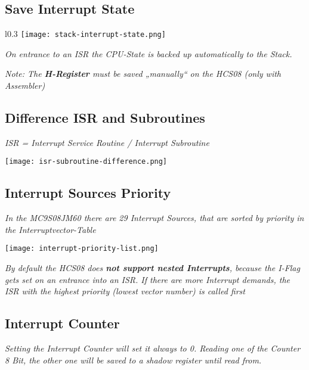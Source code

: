 \subsection{Save Interrupt State}

\begin{wrapfigure}{l}{0.3\textwidth}
    \centering
    \hspace{-20pt}
    \texttt{[image: stack-interrupt-state.png]}
    \hspace{-50pt}
\end{wrapfigure}

\textit{
    On entrance to an ISR the CPU-State is backed up automatically to the
    Stack.
    \newline
    \newline
}

\textit{
    Note: The \textbf{H-Register} must be saved „manually“ on the HCS08 (only
    with Assembler)
}

\subsection{Difference ISR and Subroutines}

\textit{ISR = Interrupt Service Routine / Interrupt Subroutine}

\texttt{[image: isr-subroutine-difference.png]}

\subsection{Interrupt Sources Priority}

\textit{
    In the MC9S08JM60 there are 29 Interrupt Sources, that are sorted by
    priority in the Interruptvector-Table
}

\texttt{[image: interrupt-priority-list.png]}

\textit{
    By default the HCS08 does \textbf{not support nested
    Interrupts}, because the I-Flag gets set on an entrance
    into an ISR. \newline
    If there are more Interrupt demands, the ISR with the
    highest priority (lowest vector number) is called first
}

\subsection{Interrupt Counter}

\textit{
    Setting the Interrupt Counter will set it always to 0.\newline
    Reading one of the Counter 8 Bit, the other one will be saved to a
    shadow register until read from.
}

